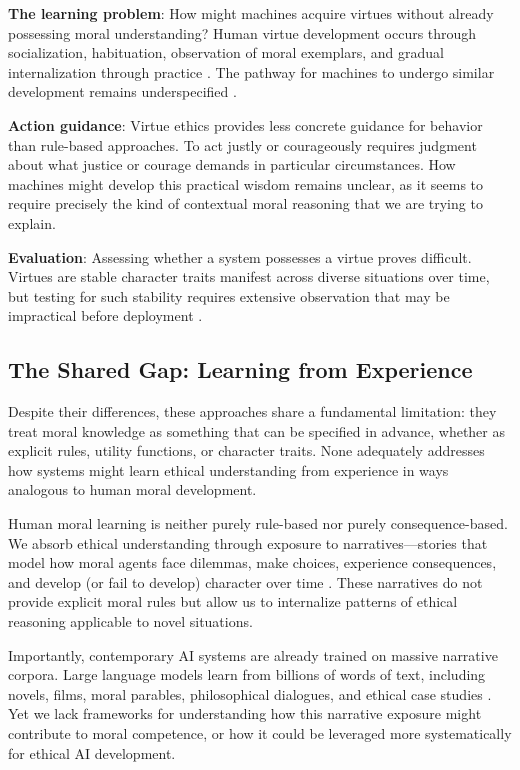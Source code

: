 \documentclass[12pt]{article}
\begin{document}
\textbf{The learning problem}: How might machines acquire virtues without already possessing moral understanding? Human virtue development occurs through socialization, habituation, observation of moral exemplars, and gradual internalization through practice \citep{aristotle350bce}. The pathway for machines to undergo similar development remains underspecified \citep{wallach2008moral}.

\textbf{Action guidance}: Virtue ethics provides less concrete guidance for behavior than rule-based approaches. To act justly or courageously requires judgment about what justice or courage demands in particular circumstances. How machines might develop this practical wisdom remains unclear, as it seems to require precisely the kind of contextual moral reasoning that we are trying to explain.

\textbf{Evaluation}: Assessing whether a system possesses a virtue proves difficult. Virtues are stable character traits manifest across diverse situations over time, but testing for such stability requires extensive observation that may be impractical before deployment \citep{anderson2011machine}.

\subsection{The Shared Gap: Learning from Experience}

Despite their differences, these approaches share a fundamental limitation: they treat moral knowledge as something that can be specified in advance, whether as explicit rules, utility functions, or character traits. None adequately addresses how systems might learn ethical understanding from experience in ways analogous to human moral development.

Human moral learning is neither purely rule-based nor purely consequence-based. We absorb ethical understanding through exposure to narratives---stories that model how moral agents face dilemmas, make choices, experience consequences, and develop (or fail to develop) character over time \citep{johnson1993moral, nussbaum1990love, bruner1991narrative}. These narratives do not provide explicit moral rules but allow us to internalize patterns of ethical reasoning applicable to novel situations.

Importantly, contemporary AI systems are already trained on massive narrative corpora. Large language models learn from billions of words of text, including novels, films, moral parables, philosophical dialogues, and ethical case studies \citep{brown2020language, openai2023gpt4}. Yet we lack frameworks for understanding how this narrative exposure might contribute to moral competence, or how it could be leveraged more systematically for ethical AI development.
\end{document}
